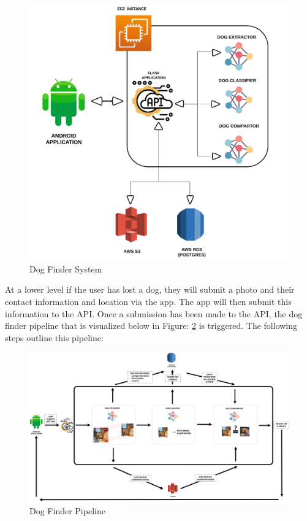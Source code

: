 \documentclass{article}
\begin{document}
\begin{figure}[h]
\centering
	\includegraphics[scale=0.1]{final-report-images/system.jpeg}
\caption{Dog Finder System}
\label{fig:x app system}
\end{figure}

At a lower level if the user has lost a dog, they will submit a photo and their contact information and location via the app.  The app will then submit this information to the API.  Once a submission has been made to the API, the dog finder pipeline that is visualized below in Figure: \ref{fig:x app pipeline} is triggered.  The following steps outline this pipeline:
\newpage

\begin{figure}[h]
\centering
	\includegraphics[width=1.0\textwidth]{final-report-images/applowlevel.png}
\caption{Dog Finder Pipeline}
\label{fig:x app pipeline}
\end{figure}
\end{document}
